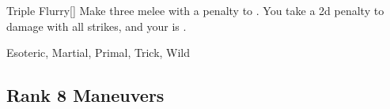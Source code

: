 \lowercase{\hypertarget{maneuver:Triple Flurry}{}}\label{maneuver:Triple Flurry}
\hypertarget{maneuver:Triple Flurry}{}
\begin{freeability}[Rank 7]{Triple Flurry}[]
Make three melee  with a  penalty to .
You take a \minus2d penalty to damage with all strikes, and your  is .


 Esoteric, Martial, Primal, Trick, Wild
\end{freeability}
\vspace{0.25em}


\subsection{Rank 8 Maneuvers}